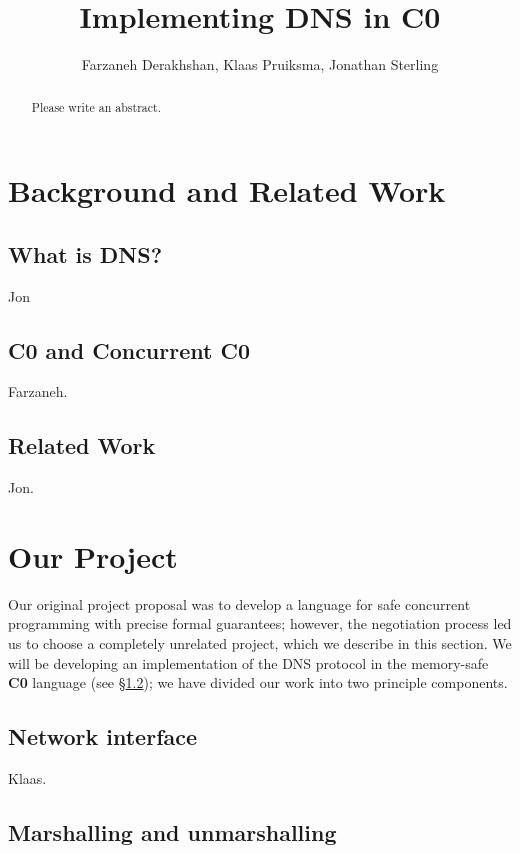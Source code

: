 \documentclass{article}
\title{Implementing DNS in C0}
\author{Farzaneh Derakhshan, Klaas Pruiksma, Jonathan Sterling}
\newcommand\Lang[1]{{\sffamily\bfseries{#1}}}
\begin{document}
\maketitle

\begin{abstract}
  Please write an abstract.
\end{abstract}

\section{Background and Related Work}

\subsection{What is DNS?}

Jon

\subsection{C0 and Concurrent C0}\label{sec:c0}

Farzaneh.

\subsection{Related Work}
Jon.

\section{Our Project}

Our original project proposal was to develop a language for safe
concurrent programming with precise formal guarantees; however, the
negotiation process led us to choose a completely unrelated project,
which we describe in this section. We will be developing an
implementation of the DNS protocol in the memory-safe \Lang{C0}
language (see \S\ref{sec:c0}); we have divided our work into two
principle components.

\subsection{Network interface}\label{sec:network-interface}

Klaas.

\subsection{Marshalling and unmarshalling}
\end{document}
